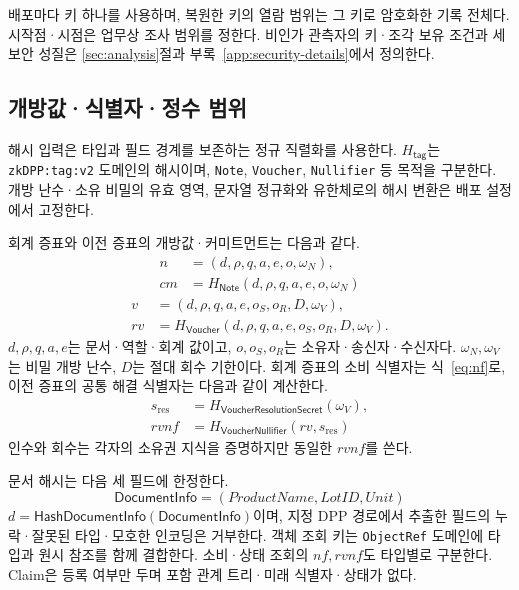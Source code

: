 배포마다 키 하나를 사용하며, 복원한 키의 열람 범위는 그 키로
암호화한 기록 전체다. 시작점·시점은 업무상 조사 범위를 정한다.
비인가 관측자의 키·조각 보유 조건과 세 보안 성질은
\ref{sec:analysis}절과 부록~\ref{app:security-details}에서 정의한다.

\subsection{개방값·식별자·정수 범위}
\label{app:formats}

해시 입력은 타입과 필드 경계를 보존하는 정규 직렬화를 사용한다.
$H_{\mathsf{tag}}$는 \texttt{zkDPP:tag:v2} 도메인의 해시이며,
\texttt{Note}, \texttt{Voucher}, \texttt{Nullifier} 등 목적을 구분한다.
개방 난수·소유 비밀의 유효 영역, 문자열 정규화와 유한체로의 해시
변환은 배포 설정에서 고정한다.

회계 증표와 이전 증표의 개방값·커미트먼트는 다음과 같다.
\begin{align}
 n&=(d,\rho,q,a,e,o,\omega_N),\nonumber\\
 cm&=H_{\mathsf{Note}}(d,\rho,q,a,e,o,\omega_N)
 \label{eq:note}
\end{align}
\begin{align}
 v&=(d,\rho,q,a,e,o_S,o_R,D,\omega_V),\nonumber\\
 rv&=H_{\mathsf{Voucher}}(d,\rho,q,a,e,o_S,o_R,D,\omega_V).
 \label{eq:voucher}
\end{align}
$d,\rho,q,a,e$는 문서·역할·회계 값이고,
$o,o_S,o_R$는 소유자·송신자·수신자다.
$\omega_N,\omega_V$는 비밀 개방 난수, $D$는 절대 회수 기한이다.
회계 증표의 소비 식별자는 식~\eqref{eq:nf}로,
이전 증표의 공통 해결 식별자는 다음과 같이 계산한다.
\begin{align}
 s_{\mathrm{res}}&=H_{\mathsf{VoucherResolutionSecret}}(\omega_V),\nonumber\\
 rvnf&=H_{\mathsf{VoucherNullifier}}(rv,s_{\mathrm{res}})
 \label{eq:rvnf}
\end{align}
인수와 회수는 각자의 소유권 지식을 증명하지만 동일한 $rvnf$를 쓴다.

문서 해시는 다음 세 필드에 한정한다.
\begin{equation}
 \mathsf{DocumentInfo}=(\mathit{ProductName},\mathit{LotID},\mathit{Unit})
 \label{eq:doc}
\end{equation}
$d=\mathsf{HashDocumentInfo}(\mathsf{DocumentInfo})$이며,
지정 DPP 경로에서 추출한 필드의 누락·잘못된 타입·모호한 인코딩은 거부한다.
객체 조회 키는 \texttt{ObjectRef} 도메인에 타입과 원시 참조를 함께
결합한다. 소비·상태 조회의 $nf,rvnf$도 타입별로 구분한다.
Claim은 등록 여부만 두며 포함 관계 트리·미래 식별자·상태가 없다.

